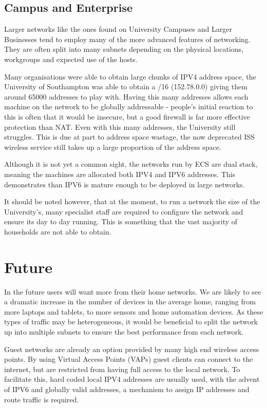 \documentclass[12pt]{report}
\begin{document}
\subsection{Campus and Enterprise}
Larger networks like the ones found on University Campuses and Larger
Businesses tend to employ many of the more advanced features of networking.
They are often split into many subnets depending on the physical locations,
workgroups and expected use of the hosts. 

Many organisations were able to obtain large chunks of IPV4 address space, the
University of Southampton was able to obtain a /16 (152.78.0.0) giving them
around 65000 addresses to play with. Having this many addresses allows each
machine on the network to be globally addressable - people's initial reaction
to this is often that it would be insecure, but a good firewall is far more effective
protection than NAT. Even with this many addresses, the University still
struggles. This is due at part to address space wastage, the now deprecated ISS
wireless service still takes up a large proportion of the address space. 

Although it is not yet a common sight, the networks run by ECS are dual stack,
meaning the machines are allocated both IPV4 and IPV6 addresses. This
demonstrates than IPV6 is mature enough to be deployed in large networks.

It should be noted however, that at the moment, to run a network the size of
the University's, many specialist staff are required to configure the network
and ensure its day to day running. This is something that the vast majority of
households are not able to obtain.

\section{Future}
In the future users will want more from their home networks. We are likely to
see a dramatic increase in the number of devices in the average home, ranging
from more laptops and tablets, to more sensors and home automation devices.
As these types of traffic may be heterogeneous, it would be beneficial to split
the network up into multiple subnets to ensure the best performance from each
network. 

Guest networks are already an option provided by many high end wireless access
points. By using Virtual Access Points (VAPs) guest clients can connect to the
internet, but are restricted from having full access to the local network. To
facilitate this, hard coded local IPV4 addresses are usually used, with the
advent of IPV6 and globally valid addresses, a mechanism to assign IP addresses
and route traffic is required.  
\end{document}
